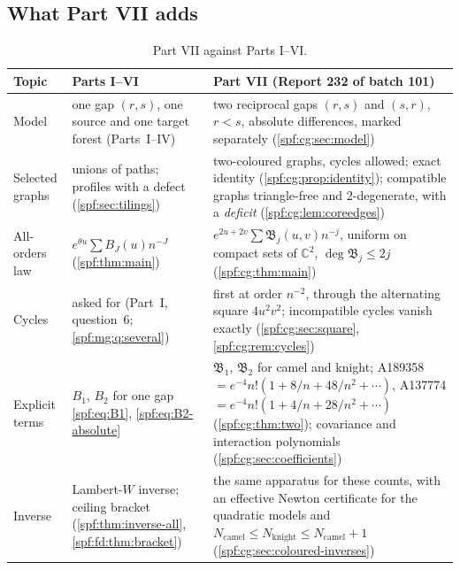 \documentclass[11pt]{article}
\numberwithin{equation}{section}
\theoremstyle{definition}
\theoremstyle{remark}
\theoremstyle{definition}
\begin{document}
\subsection{What Part VII adds}
\label{spf:cg:sec:claims}

\begin{table}[htbp]
\centering\small
\renewcommand{\arraystretch}{1.15}
\begin{tabular}{@{}>{\raggedright\arraybackslash}p{}>{\raggedright\arraybackslash}p{}>{\raggedright\arraybackslash}p{}@{}}
\toprule
Topic & Parts I--VI & Part VII (Report 232 of batch 101)\\
\midrule
Model &
one gap $(r,s)$, one source and one target forest (Parts~I--IV) &
two reciprocal gaps $(r,s)$ and $(s,r)$, $r<s$, absolute differences, marked
separately (\cref{spf:cg:sec:model})\\
Selected graphs &
unions of paths; profiles with a defect (\cref{spf:sec:tilings}) &
two-coloured graphs, cycles allowed; exact identity
(\cref{spf:cg:prop:identity}); compatible graphs triangle-free and
2-degenerate, with a \emph{deficit} (\cref{spf:cg:lem:coreedges})\\
All-orders law &
$e^{\theta u}\sum B_J(u)n^{-J}$ (\cref{spf:thm:main}) &
$e^{2u+2v}\sum\mathfrak B_j(u,v)n^{-j}$, uniform on compact sets of
$\mathbb C^2$, $\deg\mathfrak B_j\le2j$ (\cref{spf:cg:thm:main})\\
Cycles &
asked for (Part~I, question~6; \cref{spf:mg:q:several}) &
first at order $n^{-2}$, through the alternating square $4u^2v^2$;
incompatible cycles vanish exactly
(\cref{spf:cg:sec:square}, \cref{spf:cg:rem:cycles})\\
Explicit terms &
$B_1$, $B_2$ for one gap \eqref{spf:eq:B1}, \eqref{spf:eq:B2-absolute} &
$\mathfrak B_1$, $\mathfrak B_2$ for camel and knight; A189358
$=e^{-4}n!(1+8/n+48/n^2+\cdots)$, A137774 $=e^{-4}n!(1+4/n+28/n^2+\cdots)$
(\cref{spf:cg:thm:two}); covariance and interaction polynomials
(\cref{spf:cg:sec:coefficients})\\
Inverse &
Lambert-$W$ inverse; ceiling bracket (\cref{spf:thm:inverse-all},
\cref{spf:fd:thm:bracket}) &
the same apparatus for these counts, with an effective Newton certificate
for the quadratic models and $N_{\mathrm{camel}}\le N_{\mathrm{knight}}\le
N_{\mathrm{camel}}+1$ (\cref{spf:cg:sec:coloured-inverses})\\
\bottomrule
\end{tabular}
\caption{Part VII against Parts I--VI.}
\label{spf:cg:tab:claims}
\end{table}
\end{document}
